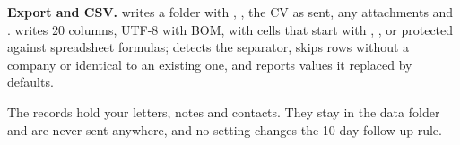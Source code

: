 \textbf{Export and CSV.}  writes a folder with ,
, the CV as sent, any attachments and .  writes
20 columns, UTF-8 with BOM, with cells that start with \code{=}, \code{+}, \code{-} or  protected against
spreadsheet formulas;  detects the separator, skips rows without a company or identical
to an existing one, and reports values it replaced by defaults.

\begin{infobox}
The records hold your letters, notes and contacts. They stay in the data folder and are never sent anywhere, and
no setting changes the 10-day follow-up rule.
\end{infobox}
